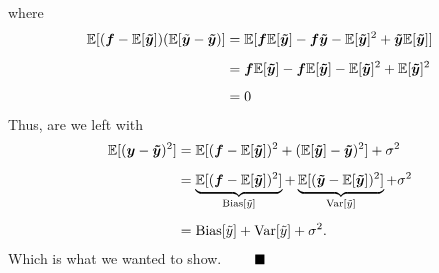 \documentclass[12pt,
               a4paper,
               article,
               oneside,
               norsk,oldfontcommands]{memoir}
\newcommand{\Q}{ \qquad \hfill \blacksquare}
\begin{document}
where
\begin{equation}
    \begin{aligned}
        \mathbb{E}[(\bm{f}- \mathbb{E}[\bm{\tilde{y}}])( \mathbb{E}[\tilde{\bm{y}} -\bm{\Tilde{y}})] &= \mathbb{E}[\bm{f}\mathbb{E}[\bm{\tilde{y}}] - \bm{f\Tilde{y}} - \mathbb{E}[\bm{\tilde{y}}]^2 + \bm{\Tilde{y}}\mathbb{E}[\bm{\tilde{y}}]]\\[5pt]
        &= \bm{f}\mathbb{E}[\bm{\tilde{y}}] - \bm{f}\mathbb{E}[\bm{\tilde{y}}] - \mathbb{E}[\bm{\tilde{y}}]^2 + \mathbb{E}[\bm{\tilde{y}}]^2\\[5pt]
        &= 0
    \end{aligned}
\end{equation}
Thus, are we left with
\begin{align*}
         \mathbb{E}[(\bm{y}-\bm{\tilde{y}})^2] &= \mathbb{E}[(\bm{f}- \mathbb{E}[\bm{\tilde{y}}])^2 + (\mathbb{E}[\bm{\tilde{y}}]-\bm{\Tilde{y}})^2] + \sigma^2\\[5pt]
         &= \underbrace{\mathbb{E}[(\bm{f}- \mathbb{E}[\bm{\tilde{y}}])^2]}_{\text{Bias}[\tilde{y}]} + \underbrace{\mathbb{E}[(\bm{\Tilde{y}}-\mathbb{E}[\bm{\tilde{y}}])^2]}_{\text{Var}[\tilde{y}]} + \sigma^2\\[5pt]
         &= \text{Bias}[\tilde{y}] + \text{Var}[\tilde{y}] + \sigma^2.
\end{align*}
Which is what we wanted to show. $\Q$
\end{document}
